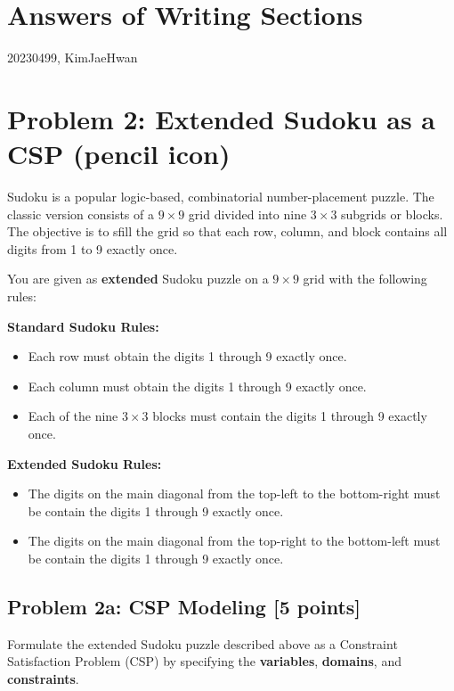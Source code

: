 \documentclass{article}%
\begin{document}
\section*{Answers of Writing Sections}

\begin{flushright}
    20230499, KimJaeHwan
\end{flushright}

\section*{Problem 2: Extended Sudoku as a CSP \tiny(pencil icon)}

Sudoku is a popular logic-based, combinatorial number-placement puzzle. The classic version consists of a $9 \times 9$ grid divided into nine $ 3 \times 3$ subgrids or blocks. The objective is to sfill the grid so that each row, column, and block contains all digits from 1 to 9 exactly once.

You are given as \textbf{extended} Sudoku puzzle on a $9 \times 9$ grid with the following rules:

\medskip
\textbf{Standard Sudoku Rules:}
\begin{itemize}[noitemsep]
    \item Each row must obtain the digits 1 through 9 exactly once.
    \item Each column must obtain the digits 1 through 9 exactly once.
    \item Each of the nine $3 \times 3$ blocks must contain the digits 1 through 9 exactly once.
\end{itemize}
\textbf{Extended Sudoku Rules:}
\begin{itemize}[noitemsep]
    \item The digits on the main diagonal from the top-left to the bottom-right must be contain the digits 1 through 9 exactly once.
    \item The digits on the main diagonal from the top-right to the bottom-left must be contain the digits 1 through 9 exactly once.
\end{itemize}

\subsection*{Problem 2a: CSP Modeling [5 points]}
Formulate the extended Sudoku puzzle described above as a Constraint Satisfaction Problem (CSP) by specifying the \textbf{variables}, \textbf{domains}, and \textbf{constraints}.
\end{document}
